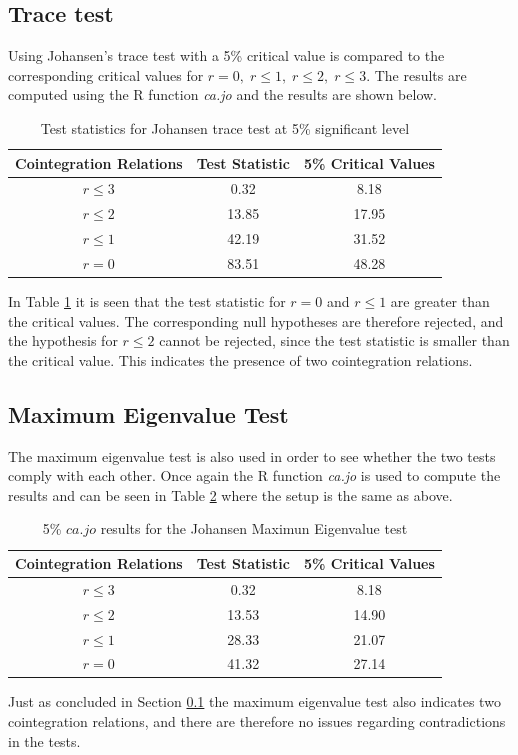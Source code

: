\subsection{Trace test}\label{subsec:johansen_trace}
Using Johansen's trace test with a 5\% critical value is compared to the corresponding critical values for $r=0,\;r\leq1,\;r\leq 2,\;r\leq3$.
The results are computed using the R function \textit{ca.jo} and the results are shown below.
\begin{table}[H]
\centering
\begin{tabular}{|c|c|c|}
\hline
\textbf{Cointegration Relations} & \textbf{Test Statistic} & \textbf{5\% Critical Values} \\ \hline
$r \leq 3$ & 0.32  & 8.18  \\ \hline
$r \leq 2$ & 13.85 & 17.95 \\ \hline
$r \leq 1$ & 42.19 & 31.52 \\ \hline
$r = 0$    & 83.51 & 48.28 \\ \hline
\end{tabular}
\caption{Test statistics for Johansen trace test at 5\% significant level}
\label{tab:traceresults}
\end{table}
In Table \ref{tab:traceresults} it is seen that the test statistic for $r=0$ and $r\leq1$ are greater than the critical values. The corresponding null hypotheses are therefore rejected, and the hypothesis for $r\leq2$ cannot be rejected, since the test statistic is smaller than the critical value. This indicates the presence of two cointegration relations.

\subsection{Maximum Eigenvalue Test}
The maximum eigenvalue test is also used in order to see whether the two tests comply with each other. Once again the R function \textit{ca.jo} is used to compute the results and can be seen in Table \ref{tab:maximal_eigenvalue} where the setup is the same as above.
\begin{table}[H]
\centering
\begin{tabular}{|c|c|c|}
\hline
\textbf{Cointegration Relations} & \textbf{Test Statistic} & \textbf{5\% Critical Values} \\ \hline
$r \leq 3$ & 0.32  & 8.18  \\ \hline
$r \leq 2$ & 13.53 & 14.90 \\ \hline
$r \leq 1$ & 28.33 & 21.07 \\ \hline
$r = 0$    & 41.32 & 27.14 \\ \hline
\end{tabular}
\caption{5\% $ca.jo$ results for the Johansen Maximun Eigenvalue test}
\label{tab:maximal_eigenvalue}
\end{table}
\noindent Just as concluded in Section \ref{subsec:johansen_trace} the maximum eigenvalue test also indicates two cointegration relations, and there are therefore no issues regarding contradictions in the tests.


